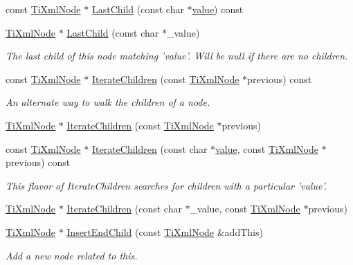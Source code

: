 \begin{DoxyCompactItemize}
const \hyperlink{classTiXmlNode}{TiXmlNode} $\ast$ \hyperlink{classTiXmlNode_acdd3fdc436aa7433023310a041e5e63f}{LastChild} (const char $\ast$\hyperlink{classTiXmlNode_aead528b3cedc33c16a6c539872c7cc8b}{value}) const 
\item 
\hyperlink{classTiXmlNode}{TiXmlNode} $\ast$ \hyperlink{classTiXmlNode_abad5bf1059c48127b958711ef89e8e5d}{LastChild} (const char $\ast$\_\-value)
\begin{DoxyCompactList}\small\item\em The last child of this node matching 'value'. Will be null if there are no children. \item\end{DoxyCompactList}\item 
const \hyperlink{classTiXmlNode}{TiXmlNode} $\ast$ \hyperlink{classTiXmlNode_aaef7ac3978c4bb1cc8a24ffae7bced75}{IterateChildren} (const \hyperlink{classTiXmlNode}{TiXmlNode} $\ast$previous) const 
\begin{DoxyCompactList}\small\item\em An alternate way to walk the children of a node. \item\end{DoxyCompactList}\item 
\hyperlink{classTiXmlNode}{TiXmlNode} $\ast$ \hyperlink{classTiXmlNode_a2358e747118fdbf0e467b1e4f7d03de1}{IterateChildren} (const \hyperlink{classTiXmlNode}{TiXmlNode} $\ast$previous)
\item 
const \hyperlink{classTiXmlNode}{TiXmlNode} $\ast$ \hyperlink{classTiXmlNode_af2b86dbe25d3d26fa48180edc5e2a9fc}{IterateChildren} (const char $\ast$\hyperlink{classTiXmlNode_aead528b3cedc33c16a6c539872c7cc8b}{value}, const \hyperlink{classTiXmlNode}{TiXmlNode} $\ast$previous) const 
\begin{DoxyCompactList}\small\item\em This flavor of IterateChildren searches for children with a particular 'value'. \item\end{DoxyCompactList}\item 
\hyperlink{classTiXmlNode}{TiXmlNode} $\ast$ \hyperlink{classTiXmlNode_a67ba8275e533e6f76340236c42ea0aea}{IterateChildren} (const char $\ast$\_\-value, const \hyperlink{classTiXmlNode}{TiXmlNode} $\ast$previous)
\item 
\hyperlink{classTiXmlNode}{TiXmlNode} $\ast$ \hyperlink{classTiXmlNode_af287a913ce46d8dbf7ef24fec69bbaf0}{InsertEndChild} (const \hyperlink{classTiXmlNode}{TiXmlNode} \&addThis)
\begin{DoxyCompactList}\small\item\em Add a new node related to this. \item\end{DoxyCompactList}\item 

\end{DoxyCompactItemize}
